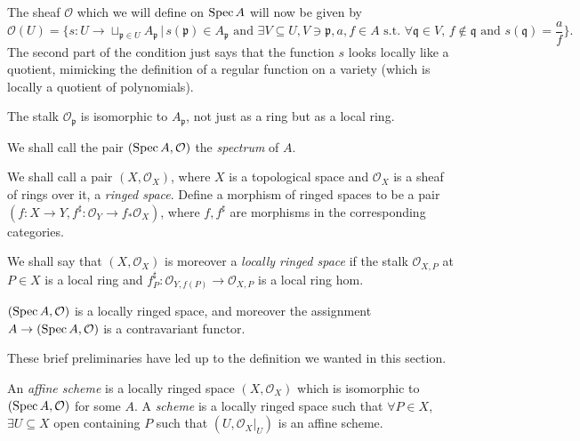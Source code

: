 \documentclass[000-main.tex]{subfiles}
\begin{document}
The sheaf $\mathcal{O}$ which we will define on $\operatorname{Spec} A$ will now be given by 
\[
  \mathcal{O}(U) = \lbrace s : U \to \sqcup_{\mathfrak{p} \in U} A_{\mathfrak{p}} \, | \, s(\mathfrak{p}) \in A_{\mathfrak{p}} \text{ and } \exists V \subseteq U, V \ni \mathfrak{p}, a, f \in A \text{ s.t. } \forall \mathfrak{q} \in V, \, f \notin \mathfrak{q} \text{ and } s(\mathfrak{q}) = \frac{a}{f} \rbrace.
\]
The second part of the condition just says that the function $s$ looks locally like a quotient, mimicking the definition of a regular function on a variety (which is locally a quotient of polynomials). 

\begin{lemma}
  The stalk $\mathcal{O}_{\mathfrak{p}}$ is isomorphic to $A_{\mathfrak{p}}$, not just as a ring but as a local ring.
\end{lemma}

We shall call the pair $(\operatorname{Spec} A, \mathcal{O})$ the \emph{spectrum} of $A$. 

\begin{definition}
  We shall call a pair $(X, \mathcal{O}_X)$, where $X$ is a topological space and $\mathcal{O}_X$ is a sheaf of rings over it, a \emph{ringed space}.
  Define a morphism of ringed spaces to be a pair $(f : X \to Y, f^\sharp : \mathcal{O}_Y \to f_\ast \mathcal{O}_X)$, where $f, f^\sharp$ are morphisms in the corresponding categories.

  We shall say that $(X, \mathcal{O}_X)$ is moreover a \emph{locally ringed space} if the stalk $\mathcal{O}_{X, P}$ at $P \in X$ is a local ring and $f^\sharp_P : \mathcal{O}_{Y, f(P)} \to \mathcal{O}_{X, P}$ is a local ring hom.
\end{definition}

\begin{example}
  $(\operatorname{Spec} A, \mathcal{O})$ is a locally ringed space, and moreover the assignment $A \to (\operatorname{Spec} A , \mathcal{O})$ is a contravariant functor.
\end{example}

These brief preliminaries have led up to the definition we wanted in this section. 

\begin{definition}
  An \emph{affine scheme} is a locally ringed space $(X, \mathcal{O}_X)$ which is isomorphic to $(\operatorname{Spec} A, \mathcal{O})$ for some $A$.
  A \emph{scheme} is a locally ringed space such that $\forall P \in X$, $\exists U \subseteq X$ open containing $P$ such that $(U, \left . \mathcal{O}_X \right \rvert_{U})$ is an affine scheme.
\end{definition}
\end{document}
